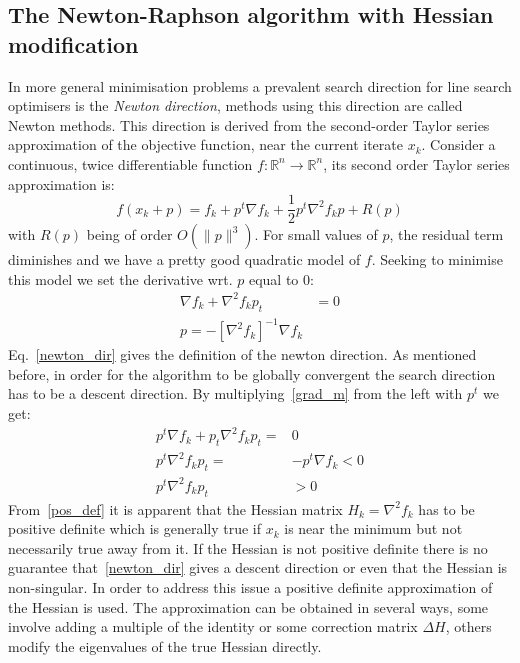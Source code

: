 \documentclass[11pt]{report}
\begin{document}
    \subsection{The Newton-Raphson algorithm with Hessian modification}
    \label{newtonalgo}
    In more general minimisation problems a prevalent search direction for line search optimisers is the \textit{Newton direction}, methods using this direction are called Newton methods.
    This direction is derived from the second-order Taylor series approximation of the objective function, near the current iterate $x_k$.
    Consider a continuous, twice differentiable function $f: \mathbb{R}^n \to \mathbb{R}^n$, its second order Taylor series approximation is:
    \begin{equation}
        f(x_k + p) = f_k + p^t \nabla f_k + \frac{1}{2} p^t \nabla^2 f_k p + R(p) \label{taylor}
    \end{equation}
    with $R(p)$ being of order $O(\rVert p \rVert^3)$.
    For small values of $p$, the residual term diminishes and we have a pretty good quadratic model of $f$.
    Seeking to minimise this model we set the derivative wrt. $p$ equal to 0:
    \begin{align}
        \nabla f_k + \nabla^2 f_k p_t &= 0  \label{grad_m} \\
        p = -\left[ \nabla^2 f_k \right]^{-1} \nabla f_k \label{newton_dir}
    \end{align}
    Eq.~\eqref{newton_dir} gives the definition of the newton direction.
    As mentioned before, in order for the algorithm to be globally convergent the search direction has to be a descent direction.
    By multiplying~\eqref{grad_m} from the left with $p^t$ we get:
    \begin{align}
        p^t \nabla f_k + p_t \nabla^2 f_k p_t =& 0 \\
        p^t \nabla^2 f_k p_t =& -p^t \nabla f_k < 0 \\
        p^t \nabla^2 f_k p_t &> 0 \label{pos_def}
    \end{align}
    From~\eqref{pos_def} it is apparent that the Hessian matrix $H_k=\nabla^2 f_k$ has to be positive definite which is generally true if $x_k$ is near the minimum but not necessarily true away from it.
    If the Hessian is not positive definite there is no guarantee that~\eqref{newton_dir} gives a descent direction or even that the Hessian is non-singular.
    In order to address this issue a positive definite approximation of the Hessian is used.
    The approximation can be obtained in several ways, some involve adding a multiple of the identity or some correction matrix $\Delta H$, others modify the eigenvalues of the true Hessian directly.
\end{document}
